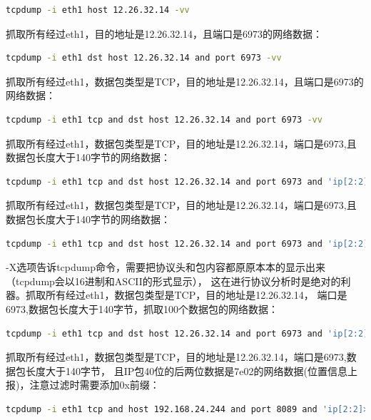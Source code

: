 \documentclass{book}
\begin{document}
\begin{lstlisting}[language=Bash]
tcpdump -i eth1 host 12.26.32.14 -vv
\end{lstlisting}

抓取所有经过eth1，目的地址是12.26.32.14，且端口是6973的网络数据：

\begin{lstlisting}[language=Bash]
tcpdump -i eth1 dst host 12.26.32.14 and port 6973 -vv
\end{lstlisting}

抓取所有经过eth1，数据包类型是TCP，目的地址是12.26.32.14，且端口是6973的网络数据：

\begin{lstlisting}[language=Bash]
tcpdump -i eth1 tcp and dst host 12.26.32.14 and port 6973 -vv
\end{lstlisting}

抓取所有经过eth1，数据包类型是TCP，目的地址是12.26.32.14，端口是6973,且数据包长度大于140字节的网络数据：

\begin{lstlisting}[language=Bash]
tcpdump -i eth1 tcp and dst host 12.26.32.14 and port 6973 and 'ip[2:2]>140' -vv
\end{lstlisting}

抓取所有经过eth1，数据包类型是TCP，目的地址是12.26.32.14，端口是6973,且数据包长度大于140字节的网络数据：

\begin{lstlisting}[language=Bash]
tcpdump -i eth1 tcp and dst host 12.26.32.14 and port 6973 and 'ip[2:2]>140' -vv -X
\end{lstlisting}

-X选项告诉tcpdump命令，需要把协议头和包内容都原原本本的显示出来（tcpdump会以16进制和ASCII的形式显示），
这在进行协议分析时是绝对的利器。抓取所有经过eth1，数据包类型是TCP，目的地址是12.26.32.14，
端口是6973,数据包长度大于140字节，抓取100个数据包的网络数据：

\begin{lstlisting}[language=Bash]
tcpdump -i eth1 tcp and dst host 12.26.32.14 and port 6973 and 'ip[2:2]>140' -vv -X -c 100
\end{lstlisting}

抓取所有经过eth1，数据包类型是TCP，目的地址是12.26.32.14，端口是6973,数据包长度大于140字节，
且IP包40位的后两位数据是7e02的网络数据(位置信息上报)，注意过滤时需要添加0x前缀：

\begin{lstlisting}[language=Bash]
tcpdump -i eth1 tcp and host 192.168.24.244 and port 8089 and 'ip[2:2]>140 and ip[41:2]=0x7e02' -vv -X -c 100
\end{lstlisting}
\end{document}
